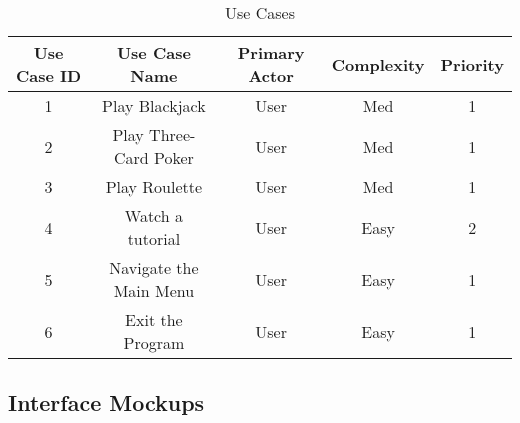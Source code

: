 \documentclass[10pt,conference,onecolumn,compsoc]{IEEEtran}
\begin{document}
\begin{table}
\centering
\begin{tabular}{|c|c|c|c|c|}
\hline
Use Case ID & Use Case Name & Primary Actor & Complexity & Priority \\
\hline \hline
1 & Play Blackjack & User & Med & 1\\
\hline
2 & Play Three-Card Poker & User & Med & 1\\
\hline
3 & Play Roulette & User & Med & 1\\
\hline
4 & Watch a tutorial & User & Easy & 2\\
\hline
5 & Navigate the Main Menu & User & Easy & 1\\
\hline
6 & Exit the Program & User & Easy & 1\\
\hline
\end{tabular}
\caption{Use Cases}
\label{tab:useCaseIndex}
\end{table}


\subsection{Interface Mockups}


\end{document}
